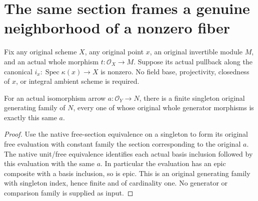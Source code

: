 \section{The same section frames a genuine neighborhood of a nonzero fiber}
Fix any original scheme $X$, any original point $x$, an original
invertible module $M$, and an actual whole morphism
$t:\mathcal O_X\to M$. Suppose its actual pullback along the canonical
$i_x:\operatorname{Spec}\kappa(x)\to X$ is nonzero. No field base,
projectivity, closedness of $x$, or integral ambient scheme is required.

\begin{lemma}
\label{lem:original-isomorphism-singleton-generators}
For an actual isomorphism arrow $a:\mathcal O_Y\to N$, there is a finite
singleton original generating family of $N$, every one of whose original
whole generator morphisms is exactly this same $a$.
\end{lemma}
\begin{proof}
Use the native free-section equivalence on a singleton to form its
original free evaluation with constant family the section corresponding
to the original $a$. The native unit/free equivalence identifies each
actual basis inclusion followed by this evaluation with the same $a$.
In particular the evaluation has an epic composite with a basis
inclusion, so is epic. This is an original generating family with
singleton index, hence finite and of cardinality one. No generator or
comparison family is supplied as input.
\end{proof}

